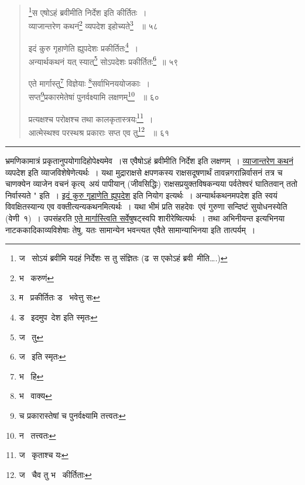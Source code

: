\documentclass[11pt, openany]{book}
\begin{document}
{\newpage

\begin{quote}
 {\na \renewcommand{\thefootnote}{1}\footnote{ज \textendash\ सोऽयं ब्रवीमि यदहं निर्देशः स तु संज्ञितः (ढ\textendash\ स एकोऽहं ब्रवी\textendash\ मीति\ldots .) }स एषोऽहं ब्रवीमीति निर्देश इति कीर्तितः~। \\
व्याजान्तरेण कथनं\renewcommand{\thefootnote}{2}\footnote{भ \textendash\ करुणं } व्यपदेश इहोच्यते\renewcommand{\thefootnote}{3}\footnote{म \textendash\ प्रकीर्तितः ड \textendash\ भवेत्तु सः} ~॥ ५८ 

इदं कुरु गृहाणेति ह्युपदेशः प्रकीर्तितः\renewcommand{\thefootnote}{4}\footnote{ड \textendash\ इदमुप\textendash\ देश इति स्मृतः }~।\\ 
अन्यार्थकथनं यत् स्यात्\renewcommand{\thefootnote}{5}\footnote{ज \textendash\ तु } सोऽपदेशः प्रकीर्तितः\renewcommand{\thefootnote}{6}\footnote{ज \textendash\ इति स्मृतः}~॥ ५९

एते मार्गास्तु\renewcommand{\thefootnote}{7}\footnote{भ \textendash\ हि } विज्ञेयाः \renewcommand{\thefootnote}{8}\footnote{भ \textendash\ वाक्य }सर्वाभिनययोजकाः~।\\ 
सप्त\renewcommand{\thefootnote}{9}\footnote{च प्रकारास्तेषां च पुनर्वक्ष्यामि तत्त्वतः}प्रकारमेतेषां पुनर्वक्ष्यामि लक्षणम्\renewcommand{\thefootnote}{10}\footnote{न \textendash\ तत्त्वतः} ~॥ ६० 

प्रत्यक्षश्च परोक्षश्च तथा कालकृतास्त्रयः\renewcommand{\thefootnote}{11}\footnote{ज \textendash\ कृताश्च यः }~। \\
आत्मेस्थश्व परस्थश्र प्रकाराः सप्त एव तु\renewcommand{\thefootnote}{12}\footnote{ज \textendash\ चैव तु भ \textendash\ कीर्तिताः } ~॥ ६१}
\end{quote}

\hrule

\vspace{2mm}

\noindent
भ्रमणिकामात्रं प्रकृतानुपयोगादिहोपेक्ष्यमेव~।स एवैषोऽहं ब्रवीमीति निर्देश इति लक्षणम्~। \underline{व्याजान्तरेण कथनं} व्यपदेश इति व्याजविशेषेणेत्यर्थः~। यथा मुद्राराक्षसे क्षपणकस्य राक्षसदूषणार्थं तावन्नगरान्निर्वासनं तत्र च चाणक्येन व्याजेन वचनं कृत्य्\textendash\ अयं पापीयान् (जीवसिद्धिः) राक्षसप्रयुक्तविषकन्यया पर्वतेश्वरं घातितवान् ततो निर्वास्यते " इति~। \underline{इदं कुरु गृहाणेति ह्युपदेश} इति नियोग इत्यर्थः~। अन्यार्थकथनमपदेश इति स्वयं विवक्षितस्यान्य एव वक्तीत्यन्यकथनमित्यर्थः~। यथा भीमं प्रति सहदेवः\textendash\ एवं गुरुणा सन्दिष्टं सुयोधनस्येति (वेणी\textendash\ १)~। उपसंहरति \underline{एते मार्गास्त्विति सर्वेषु}षट्स्वपि शारीरेष्वित्यर्थः~। तथा अभिनीयन्त इत्यभिनया नाटककादिकाव्यविशेषाः तेषु, यतः सामान्येन भवन्त्यत एवैते सामान्याभिनया इति तात्पर्यम्~।

}
\end{document}

